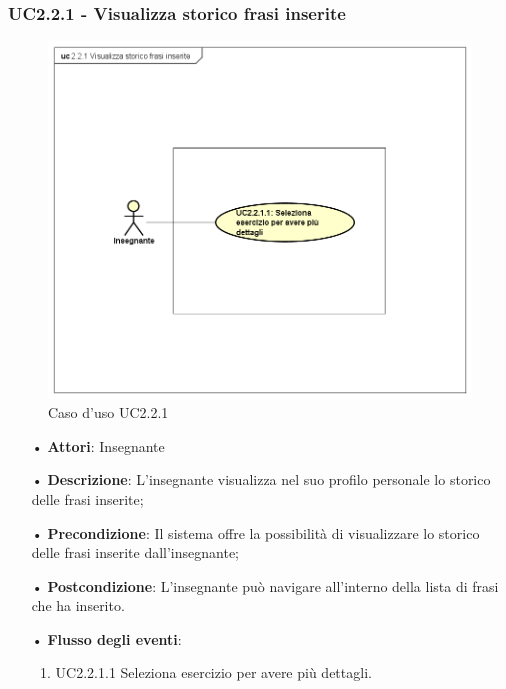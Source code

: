 \subsubsection{UC2.2.1 - Visualizza storico frasi inserite}

\begin{figure}[H]
\centering
\includegraphics[width=17cm]{img/UC221.png} 
\caption{Caso d'uso UC2.2.1}
\end{figure}

\begin{itemize}
	\item[•] \textbf{Attori}:  Insegnante	\item[•] \textbf{Descrizione}: L’insegnante visualizza nel suo profilo personale lo storico delle frasi inserite; 
	\item[•] \textbf{Precondizione}: Il sistema offre la possibilità di visualizzare lo storico delle frasi inserite dall’insegnante;
	\item[•] \textbf{Postcondizione}:  L’insegnante può navigare all’interno della lista di frasi che ha inserito.
	\item[•] \textbf{Flusso degli eventi}:
		\begin{enumerate}
			\item UC2.2.1.1  Seleziona esercizio per avere più dettagli.
		\end{enumerate}
\end{itemize}

